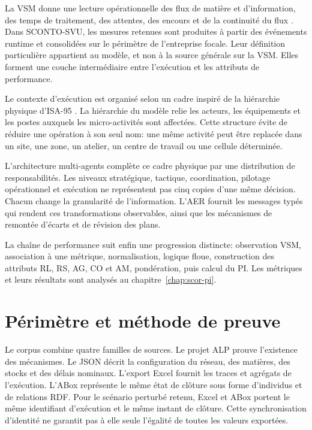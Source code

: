 La VSM donne une lecture opérationnelle des flux de matière et d'information, des temps de traitement, des attentes, des encours et de la continuité du flux \cite{rothershook2003}. Dans SCONTO-SVU, les mesures retenues sont produites à partir des événements runtime et consolidées sur le périmètre de l'entreprise focale. Leur définition particulière appartient au modèle, et non à la source générale sur la VSM. Elles forment une couche intermédiaire entre l'exécution et les attributs de performance.

Le contexte d'exécution est organisé selon un cadre inspiré de la hiérarchie physique d'ISA-95 \cite{isa2025}. La hiérarchie du modèle relie les acteurs, les équipements et les postes auxquels les micro-activités sont affectées. Cette structure évite de réduire une opération à son seul nom: une même activité peut être replacée dans un site, une zone, un atelier, un centre de travail ou une cellule déterminée.

L'architecture multi-agents complète ce cadre physique par une distribution de responsabilités. Les niveaux stratégique, tactique, coordination, pilotage opérationnel et exécution ne représentent pas cinq copies d'une même décision. Chacun change la granularité de l'information. L'AER fournit les messages typés qui rendent ces transformations observables, ainsi que les mécanismes de remontée d'écarts et de révision des plans.

La chaîne de performance suit enfin une progression distincte: observation VSM, association à une métrique, normalisation, logique floue, construction des attributs RL, RS, AG, CO et AM, pondération, puis calcul du PI. Les métriques et leurs résultats sont analysés au chapitre~\ref{chap:scor-pi}.

\section{Périmètre et méthode de preuve}

Le corpus combine quatre familles de sources. Le projet ALP prouve l'existence des mécanismes. Le JSON décrit la configuration du réseau, des matières, des stocks et des délais nominaux. L'export Excel fournit les traces et agrégats de l'exécution. L'ABox représente le même état de clôture sous forme d'individus et de relations RDF. Pour le scénario perturbé retenu, Excel et ABox portent le même identifiant d'exécution et le même instant de clôture. Cette synchronisation d'identité ne garantit pas à elle seule l'égalité de toutes les valeurs exportées.

